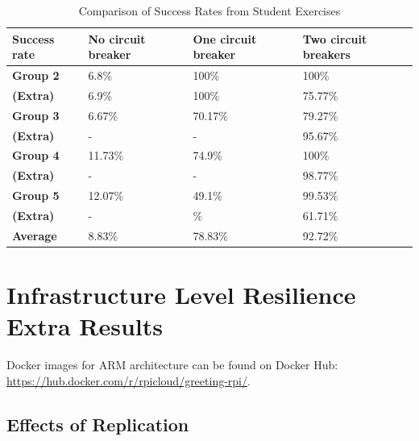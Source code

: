 \renewcommand*{\arraystretch}{1.7}
\begin{table}[H]
\centering
\begin{tabular}{|p{2cm}|p{3.5cm}|p{3.5cm}|p{3.5cm}|} 
\hline
\rowcolor[HTML]{EFEFEF} \textbf{Success rate} &     \textbf{No circuit breaker} & \textbf{One circuit breaker} & \textbf{Two circuit breakers} \\ \hline
\textbf{Group 2} &     6.8\% & 100\% & 100\% \\ \hline
\textbf{(Extra)} &     6.9\% & 100\% & 75.77\% \\ \hline
\textbf{Group 3} &     6.67\% & 70.17\% & 79.27\% \\ \hline
\textbf{(Extra)} &     - & - & 95.67\% \\ \hline
\textbf{Group 4} &     11.73\% & 74.9\% & 100\% \\ \hline
\textbf{(Extra)} &     - & - & 98.77\% \\ \hline
\textbf{Group 5} &     12.07\% & 49.1\% & 99.53\% \\ \hline
\textbf{(Extra)} &     - & \% & 61.71\% \\ \hline
\rowcolor[HTML]{EFEFEF} \textbf{Average} &     8.83\% & 78.83\% & 92.72\% \\ \hline
\end{tabular}
\caption{Comparison of Success Rates from Student Exercises}
\label{table:appendix_student_integration_points}
\end{table}





\section*{Infrastructure Level Resilience Extra Results}

Docker images for ARM architecture can be found on Docker Hub: \url{https://hub.docker.com/r/rpicloud/greeting-rpi/}. 

\subsection*{Effects of Replication}


